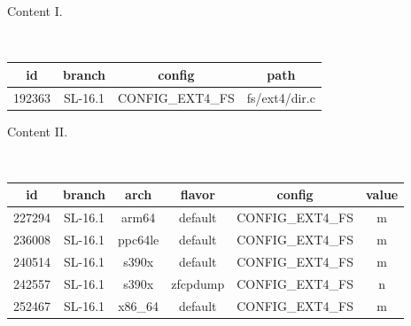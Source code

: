 \begin{frame}{}{Content I.}


  \pause

  \begin{block}{ \\
      }
    \pause
    \begin{center}
      \begin{tabular}{|c|c|c|c|} \hline
	\bf id & \bf branch & \bf config & \bf path \\ \hline
	192363 & SL-16.1 & CONFIG\_EXT4\_FS & fs/ext4/dir.c \\ \hline
      \end{tabular}
    \end{center}
  \end{block}

\end{frame}

\begin{frame}{}{Content II.}


  \pause

  \begin{block}{ \\
      }
    \pause
    \begin{center}
      \begin{tabular}{|c|c|c|c|c|c|} \hline
	\bf id & \bf branch & \bf arch & \bf flavor & \bf config & \bf value \\ \hline
	227294 & SL-16.1 & arm64   & default  & CONFIG\_EXT4\_FS & m \\ \hline
	236008 & SL-16.1 & ppc64le & default  & CONFIG\_EXT4\_FS & m \\ \hline
	240514 & SL-16.1 & s390x   & default  & CONFIG\_EXT4\_FS & m \\ \hline
	242557 & SL-16.1 & s390x   & zfcpdump & CONFIG\_EXT4\_FS & n \\ \hline
	252467 & SL-16.1 & x86\_64  & default & CONFIG\_EXT4\_FS & m \\ \hline
      \end{tabular}
    \end{center}
  \end{block}

\end{frame}

